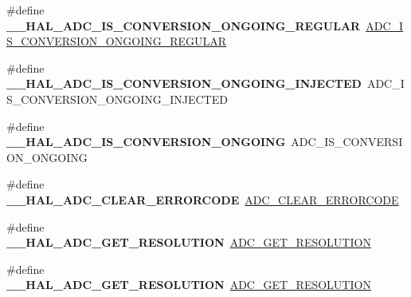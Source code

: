 \begin{DoxyCompactItemize}
\#define {\bfseries \+\_\+\+\_\+\+H\+A\+L\+\_\+\+A\+D\+C\+\_\+\+I\+S\+\_\+\+C\+O\+N\+V\+E\+R\+S\+I\+O\+N\+\_\+\+O\+N\+G\+O\+I\+N\+G\+\_\+\+R\+E\+G\+U\+L\+AR}~\hyperlink{group___a_d_c___private___macros_ga5df8ea820271c854b85617162b08c6d3}{A\+D\+C\+\_\+\+I\+S\+\_\+\+C\+O\+N\+V\+E\+R\+S\+I\+O\+N\+\_\+\+O\+N\+G\+O\+I\+N\+G\+\_\+\+R\+E\+G\+U\+L\+AR}
\item 
\mbox{\label{group___h_a_l___a_d_c___aliased___macros_ga085a3824fd83a50c46bcc8edaf0f986d}} 
\#define {\bfseries \+\_\+\+\_\+\+H\+A\+L\+\_\+\+A\+D\+C\+\_\+\+I\+S\+\_\+\+C\+O\+N\+V\+E\+R\+S\+I\+O\+N\+\_\+\+O\+N\+G\+O\+I\+N\+G\+\_\+\+I\+N\+J\+E\+C\+T\+ED}~A\+D\+C\+\_\+\+I\+S\+\_\+\+C\+O\+N\+V\+E\+R\+S\+I\+O\+N\+\_\+\+O\+N\+G\+O\+I\+N\+G\+\_\+\+I\+N\+J\+E\+C\+T\+ED
\item 
\mbox{\label{group___h_a_l___a_d_c___aliased___macros_ga64acf0d02a8ef5df5644c4232cef1fca}} 
\#define {\bfseries \+\_\+\+\_\+\+H\+A\+L\+\_\+\+A\+D\+C\+\_\+\+I\+S\+\_\+\+C\+O\+N\+V\+E\+R\+S\+I\+O\+N\+\_\+\+O\+N\+G\+O\+I\+NG}~A\+D\+C\+\_\+\+I\+S\+\_\+\+C\+O\+N\+V\+E\+R\+S\+I\+O\+N\+\_\+\+O\+N\+G\+O\+I\+NG
\item 
\mbox{\label{group___h_a_l___a_d_c___aliased___macros_ga18c93f7ab9df4bb73371bbe50a131d6d}} 
\#define {\bfseries \+\_\+\+\_\+\+H\+A\+L\+\_\+\+A\+D\+C\+\_\+\+C\+L\+E\+A\+R\+\_\+\+E\+R\+R\+O\+R\+C\+O\+DE}~\hyperlink{group___a_d_c___private___macros_gac7ab87a3ab932eed1b3ac5faad4e3aa9}{A\+D\+C\+\_\+\+C\+L\+E\+A\+R\+\_\+\+E\+R\+R\+O\+R\+C\+O\+DE}
\item 
\mbox{\label{group___h_a_l___a_d_c___aliased___macros_gaadc60b61ddd4d5572f3a4c6dbc0520a6}} 
\#define {\bfseries \+\_\+\+\_\+\+H\+A\+L\+\_\+\+A\+D\+C\+\_\+\+G\+E\+T\+\_\+\+R\+E\+S\+O\+L\+U\+T\+I\+ON}~\hyperlink{group___a_d_c___private___macros_gae2da95074db4dd0418c1dd1f13ad7970}{A\+D\+C\+\_\+\+G\+E\+T\+\_\+\+R\+E\+S\+O\+L\+U\+T\+I\+ON}
\item 
\mbox{\label{group___h_a_l___a_d_c___aliased___macros_gaadc60b61ddd4d5572f3a4c6dbc0520a6}} 
\#define {\bfseries \+\_\+\+\_\+\+H\+A\+L\+\_\+\+A\+D\+C\+\_\+\+G\+E\+T\+\_\+\+R\+E\+S\+O\+L\+U\+T\+I\+ON}~\hyperlink{group___a_d_c___private___macros_gae2da95074db4dd0418c1dd1f13ad7970}{A\+D\+C\+\_\+\+G\+E\+T\+\_\+\+R\+E\+S\+O\+L\+U\+T\+I\+ON}

\end{DoxyCompactItemize}
